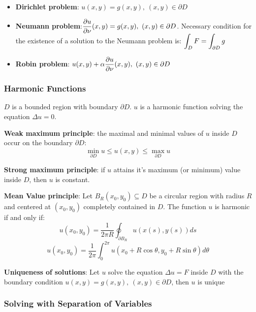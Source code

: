 \documentclass{article}
\begin{document}
\begin{twocolumn}
\begin{itemize}
	\item \textbf{Dirichlet problem}: $u(x,y) = g(x,y), \ (x,y) \in \partial D$
	\item \textbf{Neumann problem}:$\displaystyle \frac{\partial u}{\partial \nu} (x,y) = g(x,y), \ (x,y) \in \partial D$. Necessary condition for the existence of a solution to the Neumann problem is: $\displaystyle \int_D F = \int_{\partial D} g$
	\item \textbf{Robin problem}: $\displaystyle u(x,y) + \alpha \frac{\partial u}{\partial \nu}(x,y), \ (x,y) \in \partial D$ 
\end{itemize}

\subsubsection{Harmonic Functions}

$D$ is a bounded region with boundary $\partial D$. $u$ is a harmonic function solving the equation $\Delta u = 0$.

\textbf{Weak maximum principle}: the maximal and minimal values of $u$ inside $D$ occur on the boundary $\partial D$:
$$\min_{\partial D} u \leq u(x,y) \leq \max_{\partial D} u$$

\textbf{Strong maximum principle}: if $u$ attains it's maximum (or minimum) value inside $D$, then $u$ is constant.

\textbf{Mean Value principle}: Let $B_R(x_0,y_0) \subseteq D$ be a circular region with radius $R$ and centered at $(x_0,y_0)$ completely contained in $D$. The function $u$ is harmonic if and only if:
$$u(x_0,y_0) = \frac{1}{2\pi R} \oint_{\partial B_R} u(x(s), y(s)) ds$$
$$u(x_0,y_0) = \frac{1}{2\pi} \int_0^{2\pi} u(x_0 + R \cos \theta, y_0 + R \sin \theta) d\theta$$

\textbf{Uniqueness of solutions}: Let $u$ solve the equation $\Delta u = F$ inside $D$ with the boundary condition $u(x,y) = g(x,y), \ (x,y) \in \partial D$, then $u$ is unique

\subsubsection{Solving with Separation of Variables}


\end{twocolumn}
\end{document}
